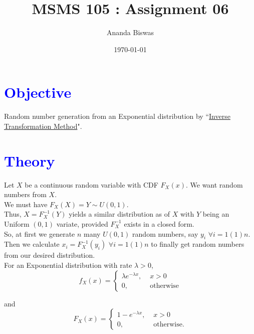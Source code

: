 \documentclass[11pt, a4paper]{article}\usepackage[]{graphicx}\usepackage[]{xcolor}
\title{MSMS 105 : Assignment 06}
\author{Ananda Biswas}
\date{\today}
\begin{document}
\maketitle


\section*{\faArrowAltCircleRight[regular] \textcolor{blue}{Objective}}

Random number generation from an Exponential distribution by ``\underline{Inverse Transformation Method}".




\section*{\faArrowAltCircleRight[regular] \textcolor{blue}{Theory}}

Let $X$ be a continuous random variable with CDF $F_{X}(x)$. We want random numbers from $X$. \\

We must have $F_{X}(X) = Y \sim U(0, 1)$. \\

Thus, $X = F_{X}^{-1}(Y)$ yields a similar distribution as of $X$ with $Y$ being an Uniform $(0, 1)$ variate, provided $F_{X}^{-1}$ exists in a closed form. \\

So, at first we generate $n$ many $U(0, 1)$ random numbers, say $y_i \,\, \forall i = 1(1)n$. \\

Then we calculate $x_i = F_{X}^{-1}(y_i) \,\, \forall i = 1(1)n$ to finally get random numbers from our desired distribution. \\

For an Exponential distribution with rate $\lambda > 0$,
\begin{equation*}
f_{X}(x) = \begin{cases}
        \lambda e^{-\lambda x}, \,\, & x > 0 \\
        0, \,\, & \text{otherwise}
            \end{cases}
\end{equation*}

and
\begin{equation*}
F_{X}(x) = \begin{cases}
          1 - e^{-\lambda x}, \,\, & x > 0 \\
          0, \,\, & \text{otherwise.}
            \end{cases}
\end{equation*}
\end{document}

